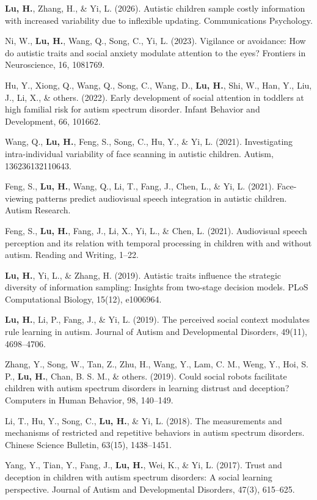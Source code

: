 \newcommand{\Inpress}{\textit{In Press}}
\newcommand{\Revision}{\textit{Under revision}}
\newcommand{\Review}{\textit{Under review}}
\newcommand{\Submitted}{\textit{Submitted}}
\newcommand{\Manuscript}{\textit{Preparing manuscript}}
\newcommand{\CS}{*} %
\newcommand{\CF}{\textsuperscript{\#}} %
\newcommand{\ME}{\textbf{Lu, H.}}


\begin{etaremune}
  \item \ME, Zhang, H., \& Yi, L. (2026). Autistic children sample costly information with increased variability due to inflexible updating. Communications Psychology.
  \item Ni, W., \ME, Wang, Q., Song, C., Yi, L. (2023). Vigilance or avoidance: How do autistic traits and social anxiety modulate attention to the eyes? Frontiers in Neuroscience, 16, 1081769.
  \item Hu, Y., Xiong, Q., Wang, Q., Song, C., Wang, D., \ME, Shi, W., Han, Y., Liu, J., Li, X., \& others. (2022). Early development of social attention in toddlers at high familial risk for autism spectrum disorder. Infant Behavior and Development, 66, 101662.
  \item Wang, Q., \ME, Feng, S., Song, C., Hu, Y., \& Yi, L. (2021). Investigating intra-individual variability of face scanning in autistic children. Autism, 136236132110643.
  \item Feng, S., \ME, Wang, Q., Li, T., Fang, J., Chen, L., \& Yi, L. (2021). Face-viewing patterns predict audiovisual speech integration in autistic children. Autism Research.
  \item Feng, S., \ME, Fang, J., Li, X., Yi, L., \& Chen, L. (2021). Audiovisual speech perception and its relation with temporal processing in children with and without autism. Reading and Writing, 1–22.
  \item \ME, Yi, L., \& Zhang, H. (2019). Autistic traits influence the strategic diversity of information sampling: Insights from two-stage decision models. PLoS Computational Biology, 15(12), e1006964.
  \item \ME, Li, P., Fang, J., \& Yi, L. (2019). The perceived social context modulates rule learning in autism. Journal of Autism and Developmental Disorders, 49(11), 4698–4706.
  \item Zhang, Y., Song, W., Tan, Z., Zhu, H., Wang, Y., Lam, C. M., Weng, Y., Hoi, S. P., \ME, Chan, B. S. M., \& others. (2019). Could social robots facilitate children with autism spectrum disorders in learning distrust and deception? Computers in Human Behavior, 98, 140–149.
  \item Li, T., Hu, Y., Song, C., \ME, \& Yi, L. (2018). The measurements and mechanisms of restricted and repetitive behaviors in autism spectrum disorders. Chinese Science Bulletin, 63(15), 1438–1451.
  \item Yang, Y., Tian, Y., Fang, J., \ME, Wei, K., \& Yi, L. (2017). Trust and deception in children with autism spectrum disorders: A social learning perspective. Journal of Autism and Developmental Disorders, 47(3), 615–625.

\end{etaremune}
